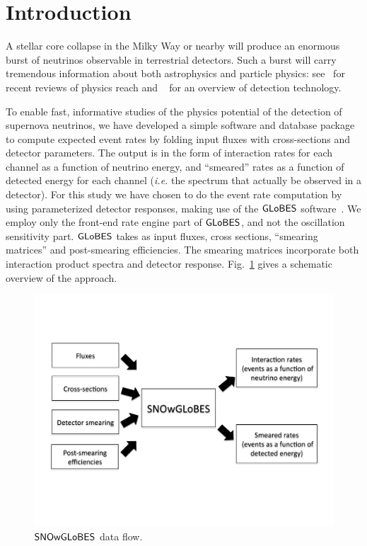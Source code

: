 \documentclass[12pt]{article}
\newcommand{\globes}{\sf{GLoBES}}
\newcommand{\snowglobes}{\sf{SNOwGLoBES}}
\begin{document}
\section{Introduction}

A stellar core collapse in the Milky Way or nearby will produce an enormous burst of neutrinos observable in terrestrial detectors.  Such a burst will carry tremendous information about both astrophysics and particle physics: see~\cite{Dighe:2008dq} for recent reviews of physics reach and ~\cite{Scholberg:2007nu} for an overview of detection technology.

To enable fast, informative studies of the physics potential of the
detection of supernova neutrinos, we have developed a simple software
and database package to compute expected event rates by folding input
fluxes with cross-sections and detector  parameters.  The output is in the
form of interaction rates for each channel as a function of neutrino
energy, and ``smeared'' rates as a function of detected energy for
each channel (\textit{i.e.} the spectrum that actually be observed in a
detector).  For this study we have chosen to do the event rate
computation by using parameterized detector responses, making use of
the $\globes$ software~\cite{Huber:2004ka,globes}.  We employ only the front-end rate
engine part of $\globes$, and not the oscillation sensitivity part.
$\globes$ takes as input fluxes, cross sections, ``smearing matrices''
and post-smearing efficiencies.  The smearing matrices incorporate
both interaction product spectra and detector response.
Fig.~\ref{fig:schematic} gives a schematic overview of the approach.

\begin{figure}
\begin{center}
\includegraphics[height=.3\textheight]{schematic.pdf}
\end{center}
\caption{$\snowglobes$ data flow.}\label{fig:schematic}
\end{figure}
\end{document}
